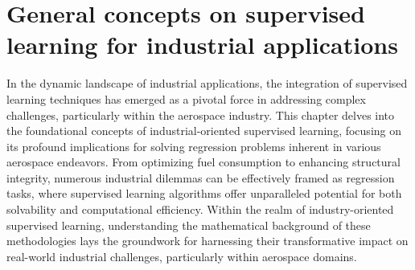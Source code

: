 \chapter{General concepts on supervised learning for industrial applications}\label{chap:1}
In the dynamic landscape of industrial applications, the integration of supervised learning techniques has emerged as a pivotal force in addressing complex challenges, particularly within the aerospace industry. This chapter delves into the foundational concepts of industrial-oriented supervised learning, focusing on its profound implications for solving regression problems inherent in various aerospace endeavors. From optimizing fuel consumption\cite{hong2018data} to enhancing structural integrity\cite{pfingstl2023warped}, numerous industrial dilemmas can be effectively framed as regression tasks, where supervised learning algorithms offer unparalleled potential for both solvability and computational efficiency. Within the realm of industry-oriented supervised learning, understanding the mathematical background of these methodologies lays the groundwork for harnessing their transformative impact on real-world industrial challenges, particularly within aerospace domains.\\
%
